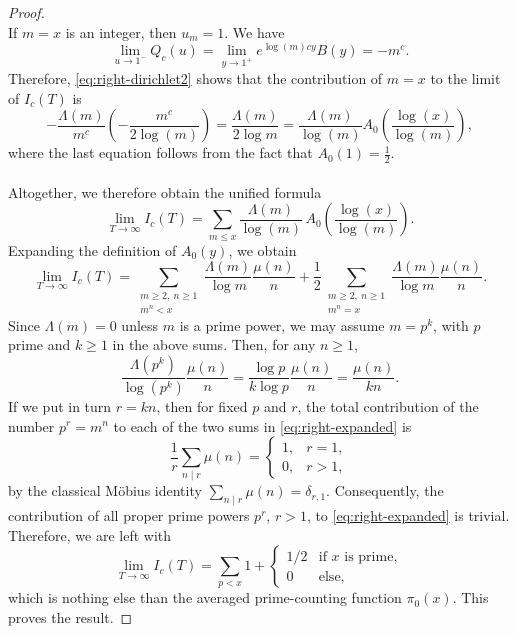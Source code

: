 \documentclass[a4paper,10pt]{amsart}
\theoremstyle{definition}
\numberwithin{equation}{section}
\begin{document}
\begin{proof}
$$$$
If $m=x$ is an integer, then $u_m=1$. We have 
$$\lim_{u\to 1^-}Q_c(u)=\lim_{y\to 1^+}e^{\log(m)cy}B(y)=-m^c.$$
Therefore, \eqref{eq:right-dirichlet2} shows that the contribution of $m=x$ to the limit of $I_c(T)$ is
$$
-\frac{\Lambda(m)}{m^c}\left(-\frac{m^c}{2\log(m)}\right)=\frac{\Lambda(m)}{2\log m}=\frac{\Lambda(m)}{\log(m)}
A_0\!\left(\frac{\log(x)}{\log(m)}\right),
$$
where the last equation follows from the fact that $A_0(1)=\frac12$.\\\\
Altogether, we therefore obtain the unified formula
\begin{equation*}\label{eq:right-limit-A0}
\lim_{T\to\infty}I_c(T)=\sum_{m\le x}\frac{\Lambda(m)}{\log(m)}\,A_0\!\left(\frac{\log(x)}{\log(m)}\right).
\end{equation*}
Expanding the definition of $A_0(y)$, we obtain
\begin{equation}\label{eq:right-expanded}
\lim_{T\to\infty}I_c(T)=\sum_{\substack{m\ge2,\ n\ge1\\ m^n<x}}\frac{\Lambda(m)}{\log m}\frac{\mu(n)}n+\frac12\sum_{\substack{m\ge2,\ n\ge1\\ m^n=x}}\frac{\Lambda(m)}{\log m}\frac{\mu(n)}n.
\end{equation}
Since $\Lambda(m)=0$ unless $m$ is a prime power, we may assume $m=p^k$, with $p$ prime and $k\ge1$ in the above sums. Then, for any $n\geq 1$, 
$$
\frac{\Lambda(p^k)}{\log(p^k)} \frac{\mu(n)}n= \frac{\log p}{k\log p} \frac{\mu(n)}n= \frac{\mu(n)}{kn}.
$$
If we put in turn $r=kn$, then for fixed $p$ and $r$, the total contribution of the number $p^r=m^n$ to each of the two sums in \eqref{eq:right-expanded} is
$$
\frac1r\sum_{n\mid r}\mu(n)=
\begin{cases}
1,&r=1,\\
0,&r>1,
\end{cases}
$$
by the classical M\"obius identity $\sum_{n\mid r}\mu(n)=\delta_{r,1}$. Consequently, the contribution of all proper prime powers $p^r$, $r>1$, to \eqref{eq:right-expanded} is trivial. Therefore, we are left with
$$
\lim_{T\to\infty}I_c(T)=\sum_{p<x}1 +
\begin{cases}
1/2& \textrm{if $x$ is prime},\\
0 & \textrm{else},
\end{cases}
$$
which is nothing else than the averaged prime-counting function $\pi_0(x)$. This proves the result.
\end{proof}
\end{document}
